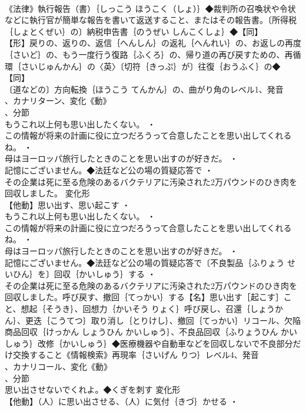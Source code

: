 \documentclass[8pt]{extreport}
\begin{document}
\begin{CJK}{UTF8}{min}
\\	《法律》執行報告（書）｛しっこう ほうこく（しょ）｝◆裁判所の召喚状や令状などに執行官が簡単な報告を書いて返送すること、またはその報告書。〔所得税｛しょとくぜい｝の〕納税申告書｛のうぜい しんこくしょ｝◆【同】
\\	【形】戻りの、返りの、返信｛へんしん｝の返礼｛へんれい｝の、お返しの再度｛さいど｝の、もう一度行う復路｛ふくろ｝の、帰り道の再び戻すための、再循環｛さいじゅんかん｝の〈英〉〔切符｛きっぷ｝が〕往復｛おうふく｝の◆【同】
\\	〔道などの〕方向転換｛ほうこう てんかん｝の、曲がり角のレベル1、発音
\\	、カナリターン、変化《動》
\\	、分節
\\	もうこれ以上何も思い出したくない。 ・
\\	この情報が将来の計画に役に立つだろうって合意したことを思い出してくれるね。 ・
\\	母はヨーロッパ旅行したときのことを思い出すのが好きだ。 ・
\\	記憶にございません。◆法廷など公の場の質疑応答で ・
\\	その企業は死に至る危険のあるバクテリアに汚染された2万パウンドのひき肉を回収しました。	変化形 
\\	【他動】思い出す、思い起こす ・
\\	もうこれ以上何も思い出したくない。 ・
\\	この情報が将来の計画に役に立つだろうって合意したことを思い出してくれるね。 ・
\\	母はヨーロッパ旅行したときのことを思い出すのが好きだ。 ・
\\	記憶にございません。◆法廷など公の場の質疑応答で〔不良製品｛ふりょう せいひん｝を〕回収｛かいしゅう｝する ・
\\	その企業は死に至る危険のあるバクテリアに汚染された2万パウンドのひき肉を回収しました。呼び戻す、撤回｛てっかい｝する【名】思い出す［起こす］こと、想起｛そうき｝、回想力｛かいそう りょく｝呼び戻し、召還｛しょうかん｝、更迭｛こうてつ｝取り消し｛とりけし｝、撤回｛てっかい｝リコール、欠陥商品回収｛けっかん しょうひん かいしゅう｝、不良品回収｛ふりょうひん かいしゅう｝改修｛かいしゅう｝◆医療機器や自動車などを回収しないで不良部分だけ交換すること《情報検索》再現率｛さいげん りつ｝レベル4、発音
\\	、カナリコール、変化《動》
\\	、分節
\\	思い出させないでくれよ。◆くぎを刺す	変化形 
\\	【他動】（人）に思い出させる、（人）に気付｛きづ｝かせる ・

\end{CJK}
\end{document}
